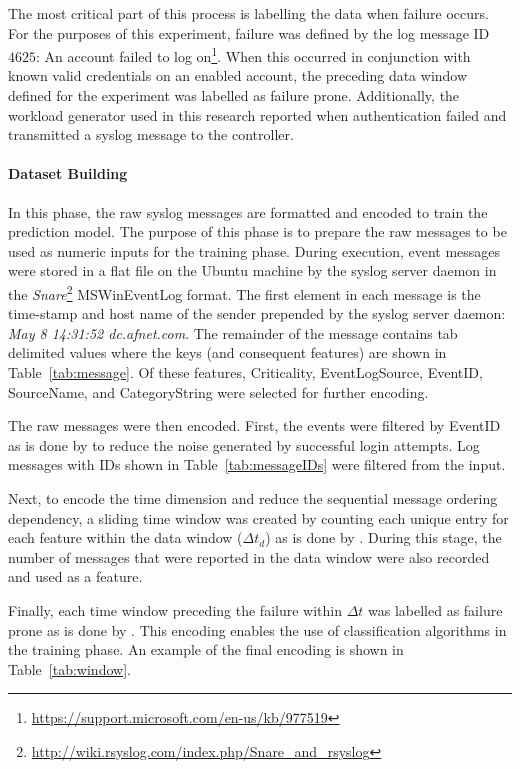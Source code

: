 The most critical part of this process is labelling the data when failure
occurs.  For the purposes of this experiment, failure was defined by the log
message ID $4625$: An account failed to log
on\footnote{\url{https://support.microsoft.com/en-us/kb/977519}}.  When this
occurred in conjunction with known valid credentials on an enabled account, the
preceding data window defined for the experiment was labelled as failure prone.
Additionally, the workload generator used in this research reported when
authentication failed and transmitted a syslog message to the controller.  

\paragraph{Dataset Building} \label{sec:dataset.building}
In this phase, the raw syslog messages are formatted and encoded to train the
prediction model.  The purpose of this phase is to prepare the raw messages to
be used as numeric inputs for the training phase.  During execution, event
messages were stored in a flat file on the Ubuntu machine by the syslog server
daemon in the
\emph{Snare}\footnote{\url{http://wiki.rsyslog.com/index.php/Snare\_and\_rsyslog}}
MSWinEventLog format.  The first element in each message is the time-stamp and
host name of the sender prepended by the syslog server daemon: \emph{May 8
14:31:52 dc.afnet.com}.  The remainder of the message contains tab delimited
values where the keys (and consequent features) are shown in
Table~\ref{tab:message}.  Of these features, Criticality, EventLogSource,
EventID, SourceName, and CategoryString were selected for further encoding.

\tabMessage

The raw messages were then encoded.  First, the events were filtered by EventID
as is done by \citet{fulp2008} to reduce the noise generated by successful
login attempts.  Log messages with IDs shown in Table~\ref{tab:messageIDs} were
filtered from the input.  

Next, to encode the time dimension and reduce the sequential message ordering
dependency, a sliding time window was created by counting each unique entry for
each feature within the data window ($\Delta t_d$) as is done by
\citet{vaarandi2002}.  During this stage, the number of messages that were
reported in the data window were also recorded and used as a feature.

Finally, each time window preceding the failure within $\Delta t$ was labelled
as failure prone as is done by \citet{irrera2015}.  This encoding enables the
use of classification algorithms in the training phase.  An example of the
final encoding is shown in Table~\ref{tab:window}.

